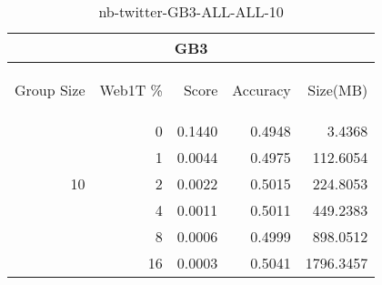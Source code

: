 \begin{center}
\begin{table}[htbp]
\begin{tabular}{ | r | r | r | r | r |}
\hline
\multicolumn{5}{|c|}{GB3}\\
\hline
\begin{sideways}Group Size\end{sideways} & \begin{sideways}Web1T \%\end{sideways} & \begin{sideways}Score\end{sideways} & \begin{sideways}Accuracy\end{sideways} & \begin{sideways}Size(MB)\end{sideways}\\
\hline
\multirow{5}{*}{10}
 & 0 & 0.1440 & 0.4948 & 3.4368\\ \cline{2-5}
 & 1 & 0.0044 & 0.4975 & 112.6054\\ \cline{2-5}
 & 2 & 0.0022 & 0.5015 & 224.8053\\ \cline{2-5}
 & 4 & 0.0011 & 0.5011 & 449.2383\\ \cline{2-5}
 & 8 & 0.0006 & 0.4999 & 898.0512\\ \cline{2-5}
 & 16 & 0.0003 & 0.5041 & 1796.3457\\ \cline{2-5}
\hline
\end{tabular}
\caption{nb-twitter-GB3-ALL-ALL-10}
\label{table:nb-twitter-GB3-ALL-ALL-10}
\end{table}
\end{center}

